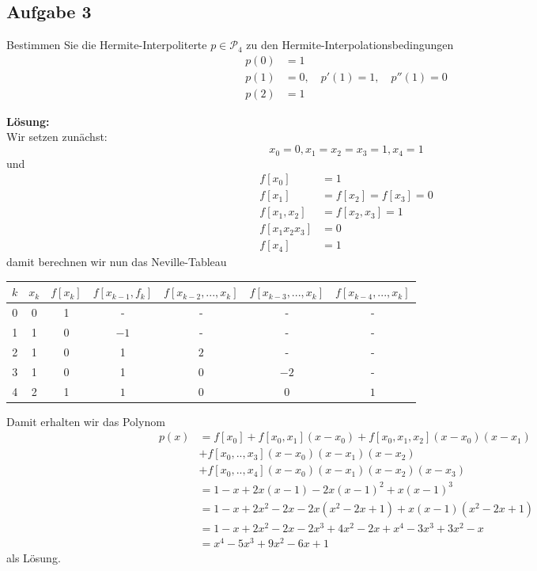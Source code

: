 \documentclass[11pt,a4paper,ngerman]{article}
\begin{document}
\subsection*{Aufgabe 3}

Bestimmen Sie die Hermite-Interpoliterte $p \in \mathcal{P}_4$ zu den Hermite-Interpolationsbedingungen
\begin{equation*}\begin{split}
    p(0) &= 1\\
    p(1) &= 0, \quad p'(1) = 1, \quad p''(1) = 0\\
    p(2) &= 1
\end{split}\end{equation*}

\textbf{Lösung:}\\

Wir setzen zunächst:
$$
    x_0 = 0, x_1 = x_2 = x_3 = 1, x_4 = 1
$$
und
\begin{equation*}\begin{split}
    f[x_0] &= 1\\
    f[x_1] &= f[x_2] = f[x_3] = 0\\
    f[x_1,x_2] &= f[x_2, x_3] = 1\\
    f[x_1x_2x_3] &= 0\\
    f[x_4] &= 1
\end{split}\end{equation*}
damit berechnen wir nun das Neville-Tableau


\begin{tabularx}{\textwidth}{c|cccccc}
$k$ & $x_k$ & $f[x_k]$ & $f[x_{k-1},f_k]$ & $f[x_{k-2}, ..., x_k]$ & $f[x_{k-3}, ..., x_k]$ & $f[x_{k-4}, ..., x_k]$\\
\hline
0 & 0 & 1 & - & - & - & -\\
1 & 1 & 0 & $-1$ & - & - & -\\
2 & 1 & 0 & 1 & $2$ & - & -\\
3 & 1 & 0 & 1 & 0 & $-2$ & -\\
4 & 2 & 1 & $1$ & 0 & $0$ & $1$\\ 
\end{tabularx}

Damit erhalten wir das Polynom 
\begin{equation*}\begin{split}
    p(x) &= f[x_0] + f[x_0, x_1](x-x_0) + f[x_0, x_1, x_2](x - x_0)(x-x_1)\\
    &+f[x_0, .. ,x_3](x - x_0)(x - x_1)(x - x_2)\\
    &+ f[x_0, .., x_4](x - x_0)(x - x_1)(x - x_2)(x - x_3)\\
    &= 1 - x + 2x(x-1) - 2x(x-1)^2 + x(x-1)^3\\
    &= 1 - x +2x^2 - 2x - 2x(x^2 -2x +1)+ x(x-1)(x^2 - 2x +1)\\
    &= 1 - x + 2x^2 - 2x - 2x^3 + 4x^2 - 2x + x^4 - 3x^3 + 3x^2 - x\\
    &= x^4 - 5x^3 + 9 x^2 - 6x + 1
\end{split}\end{equation*}
als Lösung.

\label{LastPage}
\end{document}
